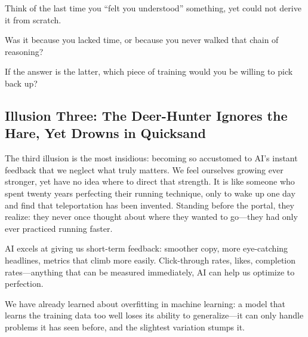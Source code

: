 \begin{thinkbox}[Reflection]
Think of the last time you ``felt you understood'' something, yet could not derive it from scratch.

Was it because you lacked time, or because you never walked that chain of reasoning?

If the answer is the latter, which piece of training would you be willing to pick back up?
\end{thinkbox}



\subsection{Illusion Three: The Deer-Hunter Ignores the Hare, Yet Drowns in Quicksand}


The third illusion is the most insidious: becoming so accustomed to AI's instant feedback that we neglect what truly matters. We feel ourselves growing ever stronger, yet have no idea where to direct that strength. It is like someone who spent twenty years perfecting their running technique, only to wake up one day and find that teleportation has been invented. Standing before the portal, they realize: they never once thought about where they wanted to go---they had only ever practiced running faster.

\vspace{1em}

AI excels at giving us short-term feedback:
smoother copy, more eye-catching headlines, metrics that climb more easily.
Click-through rates, likes, completion rates---anything that can be measured immediately, AI can help us optimize to perfection.

\vspace{1em}

We have already learned about overfitting in machine learning: a model that learns the training data too well loses its ability to generalize---it can only handle problems it has seen before, and the slightest variation stumps it.


